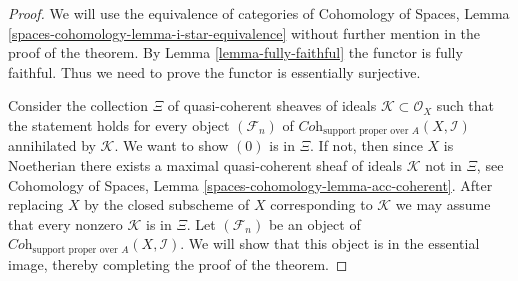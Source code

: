 \begin{proof}
We will use the equivalence of categories of
Cohomology of Spaces, Lemma \ref{spaces-cohomology-lemma-i-star-equivalence}
without further mention in the proof of the theorem.
By Lemma \ref{lemma-fully-faithful} the functor is fully faithful.
Thus we need to prove the functor is essentially surjective.

\medskip\noindent
Consider the collection $\Xi$ of quasi-coherent sheaves of ideals
$\mathcal{K} \subset \mathcal{O}_X$ such that the statement holds
for every object $(\mathcal{F}_n)$ of
$\textit{Coh}_{\text{support proper over }A}(X, \mathcal{I})$
annihilated by $\mathcal{K}$. We want to show $(0)$ is in $\Xi$.
If not, then since $X$ is Noetherian there exists a maximal
quasi-coherent sheaf of ideals $\mathcal{K}$ not in $\Xi$, see
Cohomology of Spaces, Lemma \ref{spaces-cohomology-lemma-acc-coherent}.
After replacing $X$ by the closed subscheme of $X$
corresponding to $\mathcal{K}$ we may assume that every nonzero
$\mathcal{K}$ is in $\Xi$. Let $(\mathcal{F}_n)$ be an object of
$\textit{Coh}_{\text{support proper over }A}(X, \mathcal{I})$.
We will show that this object is in the essential image, thereby
completing the proof of the theorem.


\end{proof}
